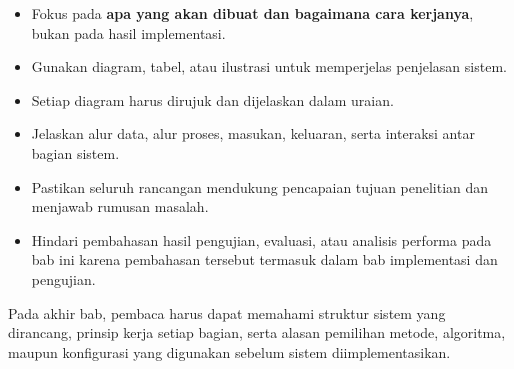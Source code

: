 \begin{itemize}[topsep=0pt,itemsep=0pt,parsep=0pt,leftmargin=*]
\item Fokus pada \textbf{apa yang akan dibuat dan bagaimana cara kerjanya}, bukan pada hasil implementasi.
\item Gunakan diagram, tabel, atau ilustrasi untuk memperjelas penjelasan sistem.
\item Setiap diagram harus dirujuk dan dijelaskan dalam uraian.
\item Jelaskan alur data, alur proses, masukan, keluaran, serta interaksi antar bagian sistem.
\item Pastikan seluruh rancangan mendukung pencapaian tujuan penelitian dan menjawab rumusan masalah.
\item Hindari pembahasan hasil pengujian, evaluasi, atau analisis performa pada bab ini karena pembahasan tersebut termasuk dalam bab implementasi dan pengujian.
\end{itemize}

Pada akhir bab, pembaca harus dapat memahami struktur sistem yang dirancang, prinsip kerja setiap bagian, serta alasan pemilihan metode, algoritma, maupun konfigurasi yang digunakan sebelum sistem diimplementasikan.
